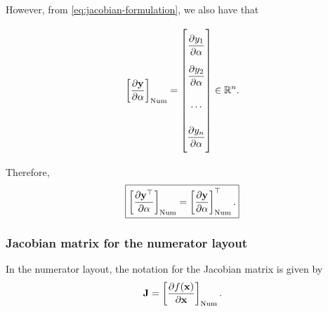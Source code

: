 \documentclass{article}
\begin{document}
However, from \eqref{eq:jacobian-formulation}, we also have that

\begin{align}
    \left[\dfrac{\partial \mathbf{y}}{\partial \alpha}\right]_{\textnormal{Num}} = \renewcommand{\arraystretch}{2.6}\begin{bmatrix}
        \dfrac{\partial y_{1}}{\partial \alpha} \\
        \dfrac{\partial y_{2}}{\partial \alpha} \\
        \cdots \\
        \dfrac{\partial y_{n}}{\partial \alpha}\vspace{1.3ex}
    \end{bmatrix} \in \mathbb{R}^{n}.
\end{align}

Therefore,
\begin{align}
    \boxed{\left[\dfrac{\partial \mathbf{y}^\top}{\partial \alpha}\right]_{\textnormal{Num}} = \left[\dfrac{\partial \mathbf{y}}{\partial \alpha}\right]_{\textnormal{Num}}^\top.}
\end{align}

\subsubsection{Jacobian matrix for the numerator layout}
In the numerator layout, the notation for the Jacobian matrix is given by
\begin{align}
    \label{eq:jacobian-numerator}
    \mathbf{J} = \left[ \frac{\partial f(\mathbf{x})}{\partial \mathbf{x}} \right]_{\textnormal{Num}}.
\end{align}
\end{document}

